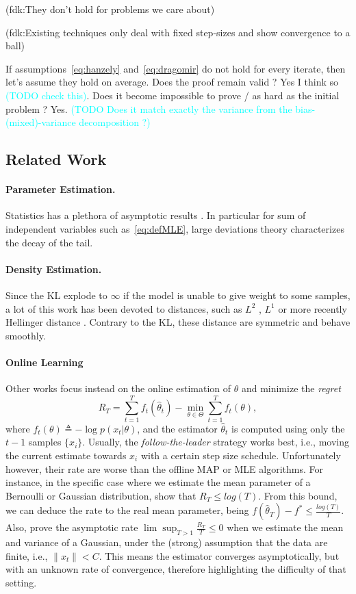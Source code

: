 \documentclass[twoside]{article}
\newcommand{\fdk}[1]{\textcolor{Periwinkle}{(fdk:#1)}}
\newcommand{\TODO}[1]{\textcolor{cyan}{(TODO #1)}}
\begin{document}
\fdk{They don't hold for problems we care about}

\fdk{Existing techniques only deal with fixed step-sizes and show convergence to a ball}

If assumptions~\eqref{eq:hanzely} and~\eqref{eq:dragomir} do not hold for every iterate, then let's assume they hold on average. Does the proof remain valid ? Yes I think so \TODO{check this}. Does it become impossible to prove / as hard as the initial problem ? Yes.
\TODO{Does it match exactly the variance from the bias-(mixed)-variance decomposition ?}

\subsection{Related Work}

\paragraph{Parameter Estimation.}
Statistics has a plethora of asymptotic results \citep{vdv1998asymptotic}.
In particular for sum of independent variables such as~\eqref{eq:defMLE}, large deviations theory \citep{varadhan1984large} characterizes the decay of the tail.

\paragraph{Density Estimation.}
Since the KL explode to $\infty$ if the model is unable to give weight to some samples, a lot of this work has been devoted to distances, such as $L^2$ \citep{tsybakov2009introduction}, $L^1$ \citep{devroye2001combinatorial} or more recently Hellinger distance \citep{baraud2017new}.
Contrary to the KL, these distance are symmetric and behave smoothly.

\paragraph{Online Learning}
Other works focus instead on the online estimation of $\theta$ and minimize the \textit{regret}
\[
R_T=\sum_{t=1}^T f_t(\hat{\theta}_t)-\min_{\theta\in\Theta}\sum_{t=1}^Tf_t(\theta),
\]
where $f_t(\theta)\triangleq-\log p(x_t|\theta)$, and the estimator $\hat{\theta}_t$ is computed using only the $t-1$ samples $\{x_i\}$. Usually, the \textit{follow-the-leader} strategy works best, i.e., moving the current estimate towards $x_i$ with a certain step size schedule. Unfortunately however, their rate are worse than the offline MAP or MLE algorithms. For instance, in the specific case where we estimate the mean parameter of a Bernoulli or Gaussian distribution, \citet{azoury2001relative} show that $R_T\leq log(T)$. From this bound, we can deduce the rate  to the real mean parameter, being $f(\hat{\theta}_T)-f^*\leq \frac{log(T)}{T}$. Also, \citet{dasgupta2007online} prove the asymptotic rate $\lim\sup_{T>1}\frac{R_T}{T}\leq 0$ when we estimate the mean and variance of a Gaussian, under the (strong) assumption that the data are finite, i.e., $\|x_t\|<C$. This means the estimator converges asymptotically, but with an unknown rate of convergence, therefore highlighting the difficulty of that setting.
\end{document}
